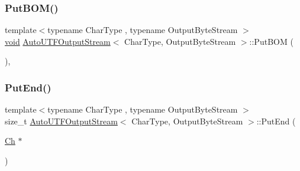 \subsubsection{\texorpdfstring{Put\+B\+O\+M()}{PutBOM()}}
{\footnotesize\ttfamily template$<$typename Char\+Type , typename Output\+Byte\+Stream $>$ \\
\hyperlink{imgui__impl__opengl3__loader_8h_ac668e7cffd9e2e9cfee428b9b2f34fa7}{void} \hyperlink{classAutoUTFOutputStream}{Auto\+U\+T\+F\+Output\+Stream}$<$ Char\+Type, Output\+Byte\+Stream $>$\+::Put\+B\+OM (\begin{DoxyParamCaption}{ }\end{DoxyParamCaption})\hspace{0.3cm}{\ttfamily [inline]}, {\ttfamily [private]}}

\mbox{\label{classAutoUTFOutputStream_a4b16bda191526c894501fce447e95b8d}} 
\subsubsection{\texorpdfstring{Put\+End()}{PutEnd()}}
{\footnotesize\ttfamily template$<$typename Char\+Type , typename Output\+Byte\+Stream $>$ \\
size\+\_\+t \hyperlink{classAutoUTFOutputStream}{Auto\+U\+T\+F\+Output\+Stream}$<$ Char\+Type, Output\+Byte\+Stream $>$\+::Put\+End (\begin{DoxyParamCaption}\item[{\hyperlink{classAutoUTFOutputStream_abd8c486101026e11828e86c18991c9c0}{Ch} $\ast$}]{ }\end{DoxyParamCaption})\hspace{0.3cm}{\ttfamily [inline]}}

\mbox{\label{classAutoUTFOutputStream_a6fbc88c345f0b7beef9053e8a0315fb4}} 
